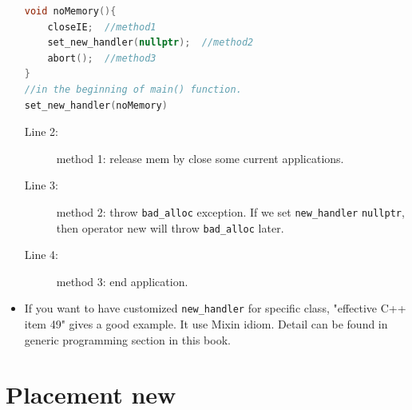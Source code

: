 \documentclass[a4paper,11pt,twoside]{book}
\begin{document}
\begin{itemize}
\begin{lstlisting}[frame=single, language=c++]
void noMemory(){
	closeIE;  //method1
	set_new_handler(nullptr);  //method2
	abort();  //method3
}
//in the beginning of main() function.
set_new_handler(noMemory)
\end{lstlisting}
\begin{description}
	\item[Line 2: ] method 1: release mem by close some current applications.
	\item[Line 3: ] method 2: throw \texttt{bad\_alloc} exception. If we set \texttt{new\_handler} \texttt{nullptr}, then operator new will throw \texttt{bad\_alloc} later.
	\item[Line 4: ] method 3: end application.
\end{description}
	

	\item If you want to have customized \texttt{new\_handler} for specific class, "effective C++ item 49" gives a good example. It use Mixin idiom. Detail can be found in generic programming section in this book.
\end{itemize}

\section{Placement new}
\end{document}

